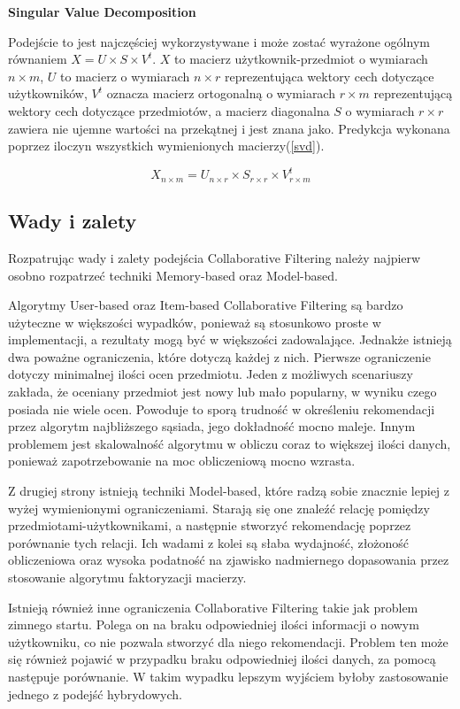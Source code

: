 \textbf{Singular Value Decomposition}


Podejście to jest najczęściej wykorzystywane i może zostać wyrażone ogólnym równaniem $ X = U \times S \times V^t$. $X$ to macierz użytkownik-przedmiot o wymiarach $n \times m$, $U$ to macierz o wymiarach $n \times r$ reprezentująca wektory cech dotyczące użytkowników, $V^t$ oznacza macierz ortogonalną o wymiarach $r \times m$ reprezentującą wektory cech dotyczące przedmiotów, a macierz diagonalna $S$ o wymiarach $r \times r$ zawiera nie ujemne wartości na przekątnej i jest znana jako. Predykcja wykonana poprzez iloczyn wszystkich wymienionych macierzy(\ref{svd}).

\begin{equation}
\label{svd}
	 X_{n \times m} = U_{n \times r} \times S_{r \times r} \times V^{t}_{r \times m}
\end{equation}

\subsection{Wady i zalety}

Rozpatrując wady i zalety podejścia Collaborative Filtering należy najpierw osobno rozpatrzeć techniki Memory-based oraz Model-based. 

Algorytmy User-based oraz Item-based Collaborative Filtering są bardzo użyteczne w większości wypadków, ponieważ są stosunkowo proste w implementacji, a rezultaty mogą być w większości zadowalające. Jednakże istnieją dwa poważne ograniczenia, które dotyczą każdej z nich. Pierwsze ograniczenie dotyczy minimalnej ilości ocen przedmiotu. Jeden z możliwych scenariuszy zakłada, że oceniany przedmiot jest nowy lub mało popularny, w wyniku czego posiada nie wiele ocen. Powoduje to sporą trudność w określeniu rekomendacji przez algorytm najbliższego sąsiada, jego dokładność mocno maleje. Innym problemem jest skalowalność algorytmu w obliczu coraz to większej ilości danych, ponieważ zapotrzebowanie na moc obliczeniową mocno wzrasta.

Z drugiej strony istnieją techniki Model-based, które radzą sobie znacznie lepiej z wyżej wymienionymi ograniczeniami. Starają się one znaleźć relację pomiędzy przedmiotami-użytkownikami, a następnie stworzyć rekomendację poprzez porównanie tych relacji. Ich wadami z kolei są słaba wydajność, złożoność obliczeniowa oraz wysoka podatność na zjawisko nadmiernego dopasowania przez stosowanie algorytmu faktoryzacji macierzy. 

Istnieją również inne ograniczenia Collaborative Filtering takie jak problem zimnego startu. Polega on na braku odpowiedniej ilości informacji o nowym użytkowniku, co nie pozwala stworzyć dla niego rekomendacji. Problem ten może się również pojawić w przypadku braku odpowiedniej ilości danych, za pomocą następuje porównanie. W takim wypadku lepszym wyjściem byłoby zastosowanie jednego z podejść hybrydowych. 


